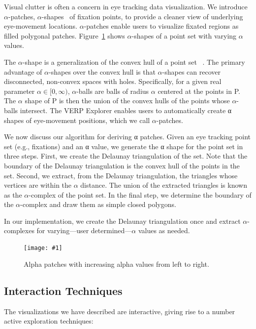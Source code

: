 \documentclass{sigchi}
\newcommand{\insertpicture}[2]{\begin{center}\texttt{[image: \#1]}\end{center}}
\begin{document}
Visual clutter is often a concern in eye tracking data visualization.  We
introduce $\alpha$-patches, $\alpha$-shapes~\cite{Edelsbrunner_1994} of 
fixation points, to provide a cleaner view of underlying eye-movement 
locations. $\alpha$-patches enable users to visualize fixated regions 
as filled polygonal patches. Figure~\ref{fig:alphapatch} shows $\alpha$-shapes 
of a point set with  varying $\alpha$ values.

The $\alpha$-shape is a generalization of the convex hull of a point set
~\cite{Edelsbrunner_1994}. The primary advantage of $\alpha$-shapes over 
the convex hull is that $\alpha$-shapes can recover disconnected, non-convex 
spaces with holes. Specifically, for a given real parameter $\alpha \in [0,\infty)$, 
$\alpha$-balls are balls of radius $\alpha$ centered at the points in P.
The $\alpha$ shape of P is then the union of the convex hulls of the
points whose $\alpha$-balls intersect. The VERP Explorer enables users
to automatically create α shapes of eye-movement positions, which we call
$\alpha$-patches.  

We now discuss our algorithm for deriving α patches. Given an eye
tracking point set (e.g., fixations) and an α value, we generate the α
shape for the point set in three steps. First, we create the Delaunay
triangulation of the set.  Note that the boundary of the Delaunay
triangulation is the convex hull of the points in the set. Second, we
extract, from the Delaunay triangulation, the triangles whose vertices
are within the $\alpha$  distance.   The union of the extracted triangles
is known as the $\alpha$-complex of the point set. In the final step, we
determine the boundary of the $\alpha$-complex and draw them as simple
closed polygons. 
	
In our implementation, we create the Delaunay triangulation once and
extract $\alpha$-complexes for varying---user determined---$\alpha$
values as needed.

	\begin{figure}
		\insertpicture{figures/alphapatch.pdf}{0.5}
		\caption{Alpha patches with increasing alpha values from left to
			right. \label{fig:alphapatch}}
	\end{figure}

\pagebreak

\subsection{Interaction Techniques} 
The visualizations we have described are interactive, giving rise 
to a number active exploration techniques: 
\end{document}
